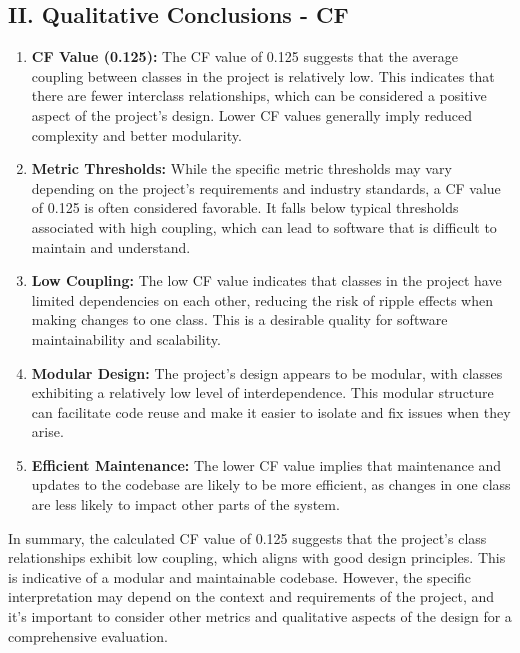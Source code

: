 \documentclass[english,12pt,a4paper]{report}
\begin{document}
	\subsection*{II. Qualitative Conclusions - CF}
	\begin{enumerate}
		\item \textbf{CF Value (0.125):} The CF value of 0.125 suggests that the average coupling between classes in the project is relatively low. This indicates that there are fewer interclass relationships, which can be considered a positive aspect of the project's design. Lower CF values generally imply reduced complexity and better modularity.
		\item \textbf{Metric Thresholds:} While the specific metric thresholds may vary depending on the project's requirements and industry standards, a CF value of 0.125 is often considered favorable. It falls below typical thresholds associated with high coupling, which can lead to software that is difficult to maintain and understand.
		\item \textbf{Low Coupling:} The low CF value indicates that classes in the project have limited dependencies on each other, reducing the risk of ripple effects when making changes to one class. This is a desirable quality for software maintainability and scalability.
		\item \textbf{Modular Design:} The project's design appears to be modular, with classes exhibiting a relatively low level of interdependence. This modular structure can facilitate code reuse and make it easier to isolate and fix issues when they arise.
		\item \textbf{Efficient Maintenance:} The lower CF value implies that maintenance and updates to the codebase are likely to be more efficient, as changes in one class are less likely to impact other parts of the system.
		
	\end{enumerate}
	In summary, the calculated CF value of 0.125 suggests that the project's class relationships exhibit low coupling, which aligns with good design principles. This is indicative of a modular and maintainable codebase. However, the specific interpretation may depend on the context and requirements of the project, and it's important to consider other metrics and qualitative aspects of the design for a comprehensive evaluation.
	
\end{document}
